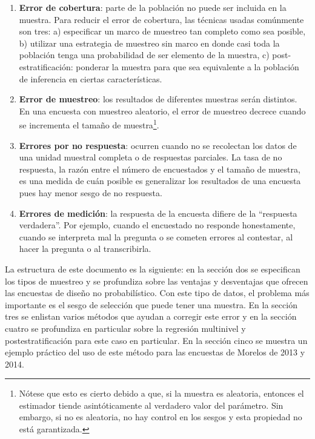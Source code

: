 \documentclass[]{article}
\let\rmarkdownfootnote\footnote%
\def\footnote{\protect\rmarkdownfootnote}
\begin{document}
\begin{enumerate}
\def\labelenumi{\arabic{enumi}.}
\item
  \textbf{Error de cobertura}: parte de la población no puede ser
  incluida en la muestra. Para reducir el error de cobertura, las
  técnicas usadas comúnmente son tres: a) especificar un marco de
  muestreo tan completo como sea posible, b) utilizar una estrategia de
  muestreo sin marco en donde casi toda la población tenga una
  probabilidad de ser elemento de la muestra, c) post-estratificación:
  ponderar la muestra para que sea equivalente a la población de
  inferencia en ciertas características.
\item
  \textbf{Error de muestreo}: los resultados de diferentes muestras
  serán distintos. En una encuesta con muestreo aleatorio, el error de
  muestreo decrece cuando se incrementa el tamaño de muestra\footnote{Nótese
    que esto es cierto debido a que, si la muestra es aleatoria,
    entonces el estimador tiende asintóticamente al verdadero valor del
    parámetro. Sin embargo, si no es aleatoria, no hay control en los
    sesgos y esta propiedad no está garantizada.}.
\item
  \textbf{Errores por no respuesta}: ocurren cuando no se recolectan los
  datos de una unidad muestral completa o de respuestas parciales. La
  tasa de no respuesta, la razón entre el número de encuestados y el
  tamaño de muestra, es una medida de cuán posible es generalizar los
  resultados de una encuesta pues hay menor sesgo de no respuesta.
\item
  \textbf{Errores de medición}: la respuesta de la encuesta difiere de
  la ``respuesta verdadera''. Por ejemplo, cuando el encuestado no
  responde honestamente, cuando se interpreta mal la pregunta o se
  cometen errores al contestar, al hacer la pregunta o al transcribirla.
\end{enumerate}

La estructura de este documento es la siguiente: en la sección dos se
especifican los tipos de muestreo y se profundiza sobre las ventajas y
desventajas que ofrecen las encuestas de diseño no probabilístico. Con
este tipo de datos, el problema más importante es el sesgo de selección
que puede tener una muestra. En la sección tres se enlistan varios
métodos que ayudan a corregir este error y en la sección cuatro se
profundiza en particular sobre la regresión multinivel y
postestratificación para este caso en particular. En la sección cinco se
muestra un ejemplo práctico del uso de este método para las encuestas de
Morelos de 2013 y 2014.
\end{document}
